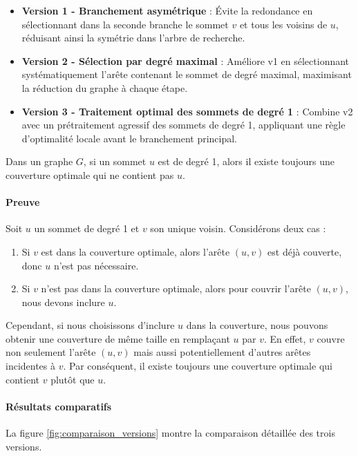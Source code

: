 \documentclass[11pt,a4paper]{article}
\begin{document}
\begin{itemize}
  \item \textbf{Version 1 - Branchement asymétrique} : Évite la redondance en sélectionnant dans la seconde branche le sommet $v$ et tous les voisins de $u$, réduisant ainsi la symétrie dans l'arbre de recherche.
  
  \item \textbf{Version 2 - Sélection par degré maximal} : Améliore v1 en sélectionnant systématiquement l'arête contenant le sommet de degré maximal, maximisant la réduction du graphe à chaque étape.
  
  \item \textbf{Version 3 - Traitement optimal des sommets de degré 1} : Combine v2 avec un prétraitement agressif des sommets de degré 1, appliquant une règle d'optimalité locale avant le branchement principal.
\end{itemize}

Dans un graphe $G$, si un sommet $u$ est de degré 1, alors il existe toujours une couverture optimale qui ne contient pas $u$.

\paragraph{Preuve}
Soit $u$ un sommet de degré 1 et $v$ son unique voisin. Considérons deux cas :

\begin{enumerate}
    \item Si $v$ est dans la couverture optimale, alors l'arête $(u,v)$ est déjà couverte, donc $u$ n'est pas nécessaire.
    
    \item Si $v$ n'est pas dans la couverture optimale, alors pour couvrir l'arête $(u,v)$, nous devons inclure $u$.
\end{enumerate}

Cependant, si nous choisissons d'inclure $u$ dans la couverture, nous pouvons obtenir une couverture de même taille en remplaçant $u$ par $v$. En effet, $v$ couvre non seulement l'arête $(u,v)$ mais aussi potentiellement d'autres arêtes incidentes à $v$. Par conséquent, il existe toujours une couverture optimale qui contient $v$ plutôt que $u$.

\paragraph{Résultats comparatifs}

La figure \ref{fig:comparaison_versions} montre la comparaison détaillée des trois versions.
\end{document}

